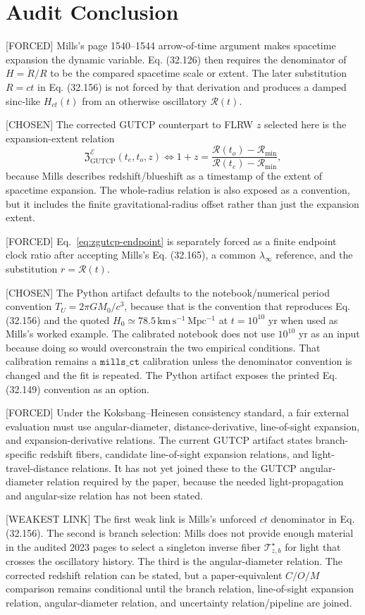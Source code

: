 \documentclass[11pt]{article}
\newcommand{\RG}{\mathcal{R}}
\newcommand{\EG}{\mathcal{E}}
\newcommand{\ZRel}{\mathfrak{Z}_{\mathrm{GUTCP}}}
\begin{document}
\section*{Audit Conclusion}

[FORCED] Mills's page 1540--1544 arrow-of-time argument makes spacetime
expansion the dynamic variable.  Eq. (32.126) then requires the denominator of
\(H=\dot R/R\) to be the compared spacetime scale or extent.  The later
substitution \(R=ct\) in Eq. (32.156) is not forced by that derivation and
produces a damped sinc-like \(H_{ct}(t)\) from an otherwise oscillatory
\(\RG(t)\).

[CHOSEN] The corrected GUTCP counterpart to FLRW \(z\) selected here is the
expansion-extent relation
\[
\ZRel^{\EG}(t_e,t_o,z)
\Longleftrightarrow
1+z=
\frac{\RG(t_o)-\RG_{\min}}{\RG(t_e)-\RG_{\min}},
\]
because Mills describes redshift/blueshift as a timestamp of the extent of
spacetime expansion.  The whole-radius relation is also exposed as a
convention, but it includes the finite gravitational-radius offset rather than
just the expansion extent.

[FORCED] Eq.~\eqref{eq:zgutcp-endpoint} is separately forced as a finite
endpoint clock ratio after accepting Mills's Eq. (32.165), a common
\(\lambda_\infty\) reference, and the substitution \(r=\RG(t)\).

[CHOSEN] The Python artifact defaults to the notebook/numerical period convention
\(T_U=2\pi GM_0/c^3\), because that is the convention that reproduces Eq. (32.156)
and the quoted \(H_0\simeq78.5\,\mathrm{km\,s^{-1}\,Mpc^{-1}}\) at
\(t=10^{10}\) yr when used as Mills's worked example.  The calibrated notebook
does not use \(10^{10}\) yr as an input because doing so would overconstrain the
two empirical conditions.  That calibration remains a \(\texttt{mills\_ct}\)
calibration unless the denominator convention is changed and the fit is repeated.
The Python artifact exposes the printed Eq. (32.149) convention as an option.

[FORCED] Under the Koksbang--Heinesen consistency standard, a fair external
evaluation must use angular-diameter, distance-derivative, line-of-sight
expansion, and expansion-derivative relations.  The current GUTCP artifact
states branch-specific redshift fibers, candidate line-of-sight expansion
relations, and light-travel-distance relations.  It has not yet joined these
to the GUTCP angular-diameter relation required by the paper, because the
needed light-propagation and angular-size relation has not been stated.

[WEAKEST LINK] The first weak link is Mills's unforced \(ct\) denominator in
Eq. (32.156).  The second is branch selection: Mills does not provide enough
material in the audited 2023 pages to select a singleton inverse fiber
\(\mathcal{T}_{z,b}^{\star}\) for light that crosses the oscillatory history.
The third is the angular-diameter relation.  The corrected redshift relation
can be stated, but a paper-equivalent \(C/O/M\) comparison remains conditional
until the branch relation, line-of-sight expansion relation, angular-diameter
relation, and uncertainty relation/pipeline are joined.
\end{document}
